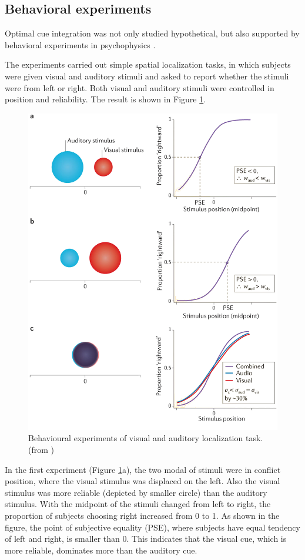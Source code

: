 \documentclass{article}[11pt]
\begin{document}
\subsection{Behavioral experiments}
Optimal cue integration was not only studied hypothetical, but also supported by behavioral experiments in psychophysics \cite{alais_ventriloquist_2004}.

The experiments carried out simple spatial localization tasks, in which subjects were given visual and auditory stimuli and asked to report whether the stimuli were from left or right. Both visual and auditory stimuli were controlled in position and reliability. The result is shown in Figure \ref{fig:visaudloc}.

\begin{figure}[htpb]
  \centering
  \includegraphics[width=.9\textwidth]{fetsch-visaudloc}
  \caption{Behavioural experiments of visual and auditory localization task. (from \cite{fetsch_bridging_2013})}
  \label{fig:visaudloc}
\end{figure}

In the first experiment (Figure \ref{fig:visaudloc}a), the two modal of stimuli were in conflict position, where the visual stimulus was displaced on the left. Also the visual stimulus was more reliable (depicted by smaller circle) than the auditory stimulus. With the midpoint of the stimuli changed from left to right, the proportion of subjects choosing right increased from 0 to 1. As shown in the figure, the point of subjective equality (PSE), where subjects have equal tendency of left and right, is smaller than 0. This indicates that the visual cue, which is more reliable, dominates more than the auditory cue.
\end{document}
